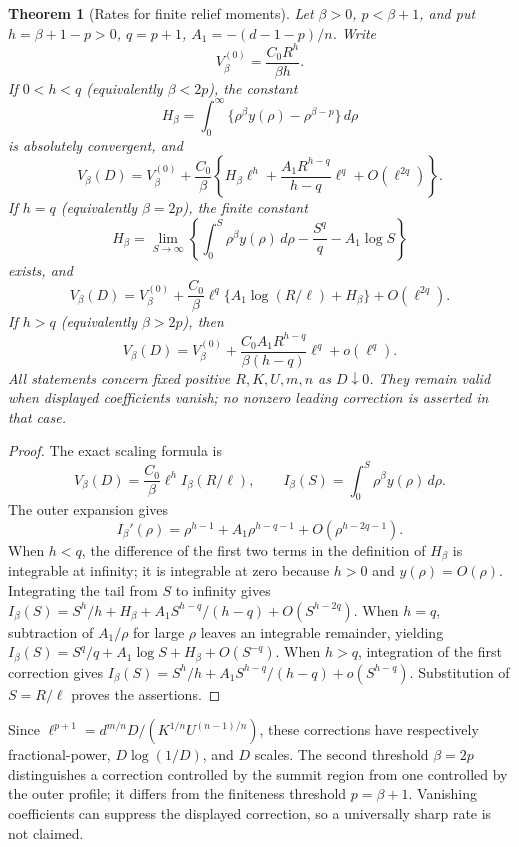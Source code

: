 \documentclass[11pt,a4paper]{article}
\newtheorem{theorem}{Theorem}[section]
\theoremstyle{definition}\newtheorem{definition}[theorem]{Definition}
\theoremstyle{remark}\newtheorem{remark}[theorem]{Remark}
\begin{document}
\begin{theorem}[Rates for finite relief moments]\label{thm:momentcorrections}
Let $\beta>0$, $p<\beta+1$, and put $h=\beta+1-p>0$,
$q=p+1$, $A_1=-(d-1-p)/n$. Write
\[
 V_\beta^{(0)}=\frac{C_0R^h}{\beta h}.
\]
If $0<h<q$ (equivalently $\beta<2p$), the constant
\[
 H_\beta=\int_0^\infty
       \{\rho^\beta y(\rho)-\rho^{\beta-p}\}\,d\rho
\]
is absolutely convergent, and
\[
 V_\beta(D)=V_\beta^{(0)}+
 \frac{C_0}{\beta}\left\{
 H_\beta\ell^h+\frac{A_1R^{h-q}}{h-q}\ell^q
 +O(\ell^{2q})\right\}.
\]
If $h=q$ (equivalently $\beta=2p$), the finite constant
\[
 H_\beta=\lim_{S\to\infty}\left\{
 \int_0^S\rho^\beta y(\rho)\,d\rho
 -\frac{S^q}{q}-A_1\log S\right\}
\]
exists, and
\[
 V_\beta(D)=V_\beta^{(0)}+
 \frac{C_0}{\beta}\ell^q
       \{A_1\log(R/\ell)+H_\beta\}
 +O(\ell^{2q}).
\]
If $h>q$ (equivalently $\beta>2p$), then
\[
 V_\beta(D)=V_\beta^{(0)}+
 \frac{C_0A_1R^{h-q}}{\beta(h-q)}\ell^q+o(\ell^q).
\]
All statements concern fixed positive $R,K,U,m,n$ as $D\downarrow0$.
They remain valid when displayed coefficients vanish; no nonzero
leading correction is asserted in that case.
\end{theorem}
\begin{proof}
The exact scaling formula is
\[
 V_\beta(D)=\frac{C_0}{\beta}\ell^h I_\beta(R/\ell),\qquad
 I_\beta(S)=\int_0^S\rho^\beta y(\rho)\,d\rho.
\]
The outer expansion gives
\[
 I_\beta'(\rho)=\rho^{h-1}
     +A_1\rho^{h-q-1}+O(\rho^{h-2q-1}).
\]
When $h<q$, the difference of the first two terms in the definition
of $H_\beta$ is integrable at infinity; it is integrable at zero
because $h>0$ and $y(\rho)=O(\rho)$. Integrating the tail from $S$
to infinity gives
$I_\beta(S)=S^h/h+H_\beta+
A_1S^{h-q}/(h-q)+O(S^{h-2q})$.
When $h=q$, subtraction of $A_1/\rho$ for large $\rho$ leaves an
integrable remainder, yielding
$I_\beta(S)=S^q/q+A_1\log S+H_\beta+O(S^{-q})$.
When $h>q$, integration of the first correction gives
$I_\beta(S)=S^h/h+A_1S^{h-q}/(h-q)+o(S^{h-q})$.
Substitution of $S=R/\ell$ proves the assertions.
\end{proof}

Since $\ell^{p+1}=d^{m/n}D/(K^{1/n}U^{(n-1)/n})$, these corrections
have respectively fractional-power, $D\log(1/D)$, and $D$ scales.
The second threshold $\beta=2p$ distinguishes a correction controlled
by the summit region from one controlled by the outer profile; it differs
from the finiteness threshold $p=\beta+1$. Vanishing coefficients can
suppress the displayed correction, so a universally sharp rate is not claimed.
\end{document}
